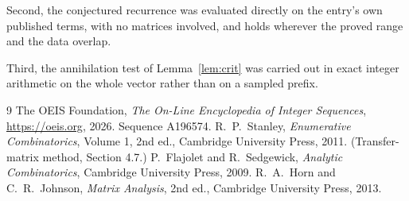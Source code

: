 \documentclass[11pt,a4paper]{article}
\theoremstyle{plain}
\theoremstyle{definition}
\begin{document}
Second, the conjectured recurrence was evaluated directly on the entry's own published terms,
with no matrices involved, and holds wherever the proved range and the data overlap.

Third, the annihilation test of Lemma~\ref{lem:crit} was carried out in exact integer
arithmetic on the whole vector rather than on a sampled prefix.

\begin{thebibliography}{9}
 The OEIS Foundation, \emph{The On-Line Encyclopedia of Integer
Sequences}, \url{https://oeis.org}, 2026. Sequence A196574.
 R.~P.~Stanley, \emph{Enumerative Combinatorics}, Volume 1, 2nd ed.,
Cambridge University Press, 2011. (Transfer-matrix method, Section 4.7.)
 P.~Flajolet and R.~Sedgewick, \emph{Analytic Combinatorics}, Cambridge
University Press, 2009.
 R.~A.~Horn and C.~R.~Johnson, \emph{Matrix Analysis}, 2nd ed., Cambridge
University Press, 2013.
\end{thebibliography}
\end{document}
